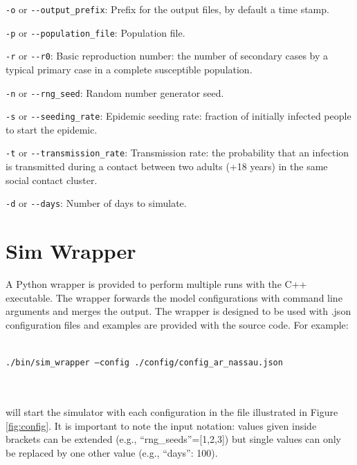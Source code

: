 \begin{compactitem}

\item \texttt{-o} or \texttt{{-}-output\_prefix}: Prefix for the output files, by default a time stamp.

\item \texttt{-p} or \texttt{{-}-population\_file}: Population file.

\item \texttt{-r} or \texttt{{-}-r0}: Basic reproduction number: the number of secondary cases by a typical primary case in a complete susceptible population.

\item \texttt{-n} or \texttt{{-}-rng\_seed}: Random number generator seed.

\item \texttt{-s} or \texttt{{-}-seeding\_rate}: Epidemic seeding rate: fraction of initially infected people to start the epidemic.

\item \texttt{-t} or \texttt{{-}-transmission\_rate}: Transmission rate: the probability that an infection is transmitted during a contact between two adults  (+18 years) in the same social contact cluster. 

\item \texttt{-d} or \texttt{{-}-days}: Number of days to simulate.
\end{compactitem}

\section{Sim Wrapper}
A Python wrapper is provided to perform multiple runs with the C++ executable. The wrapper forwards the model configurations with command line arguments and merges the output. The wrapper is designed to be used with .json configuration files and examples are provided with the source code. 
For example: \\ \\
\centerline{\texttt{./bin/sim\_wrapper --config ./config/config\_ar\_nassau.json}} \\ \\
will start the simulator with each configuration in the file illustrated in Figure \ref{fig:config}.
It is important to note the input notation: values given inside brackets can be extended (e.g., ``rng\_seeds''=[1,2,3]) but single values can only be replaced by one other value (e.g., ``days'': 100).


